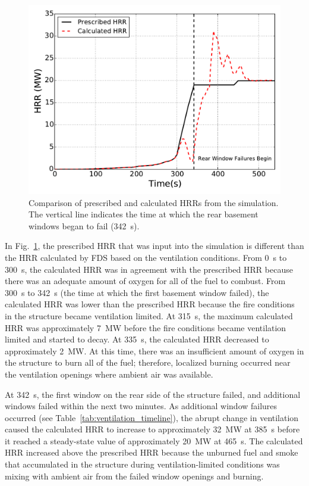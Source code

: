 \documentclass[12pt,oneside]{book}
\begin{document}
\begin{figure}[!ht]
\includegraphics[width=5.5in]{../Figures/Fire_HRR_w_FDS}
\caption[Prescribed and calculated HRR vs. time from the simulation.]
{Comparison of prescribed and calculated HRRs from the simulation. The vertical line indicates the time at which the rear basement windows began to fail (342~s).}
\label{fig:hrr_w_fds}
\end{figure}


\clearpage


In Fig.~\ref{fig:hrr_w_fds}, the prescribed HRR that was input into the simulation is different than the HRR calculated by FDS based on the ventilation conditions. From 0~s to 300~s, the calculated HRR was in agreement with the prescribed HRR because there was an adequate amount of oxygen for all of the fuel to combust. From 300~s to 342~s (the time at which the first basement window failed), the calculated HRR was lower than the prescribed HRR because the fire conditions in the structure became ventilation limited. At 315~s, the maximum calculated HRR was approximately 7~MW before the fire conditions became ventilation limited and started to decay. At 335~s, the calculated HRR decreased to approximately 2~MW. At this time, there was an insufficient amount of oxygen in the structure to burn all of the fuel; therefore, localized burning occurred near the ventilation openings where ambient air was available.

At 342~s, the first window on the rear side of the structure failed, and additional windows failed within the next two minutes. As additional window failures occurred (see Table~\ref{tab:ventilation_timeline}), the abrupt change in ventilation caused the calculated HRR to increase to approximately 32~MW at 385~s before it reached a steady-state value of approximately 20~MW at 465~s. The calculated HRR increased above the prescribed HRR because the unburned fuel and smoke that accumulated in the structure during ventilation-limited conditions was mixing with ambient air from the failed window openings and burning.
\end{document}
